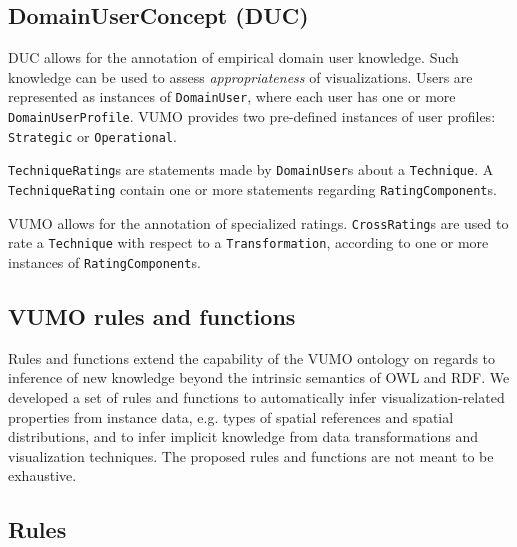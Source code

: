 \documentclass[]{interact}
\theoremstyle{plain}%
\theoremstyle{definition}
\theoremstyle{remark}
\theoremstyle{definition}
\begin{document}
\subsection{DomainUserConcept (DUC)}
\label{sec:duc}

DUC allows for the annotation of empirical domain user knowledge. Such knowledge can be used to assess \textit{appropriateness} of visualizations. Users are represented as instances of \texttt{DomainUser}, where each user has one or more \texttt{DomainUserProfile}. VUMO provides two pre-defined instances of user profiles: \texttt{Strategic} or \texttt{Operational}.


\texttt{TechniqueRating}s are statements made by \texttt{DomainUser}s about a \texttt{Technique}. A \texttt{Techni\-queRating} contain one or more statements regarding \texttt{Rating\-Component}s.

VUMO allows for the annotation of specialized ratings. \texttt{CrossRating}s are used to rate a \texttt{Technique} with respect to a \texttt{Transformation}, according to one or more instances of \texttt{Rating\-Component}s.



\subsection{VUMO rules and functions}
\label{sec:vumorules}

Rules and functions extend the capability of the VUMO ontology on regards to inference of new knowledge beyond the intrinsic semantics of OWL and RDF. We developed a set of rules and functions to automatically infer visualization-related properties from instance data, e.g. types of spatial references and spatial distributions, and to infer implicit knowledge from data transformations and visualization techniques. The proposed rules and functions are not meant to be exhaustive. %


\subsection{Rules}
\end{document}
